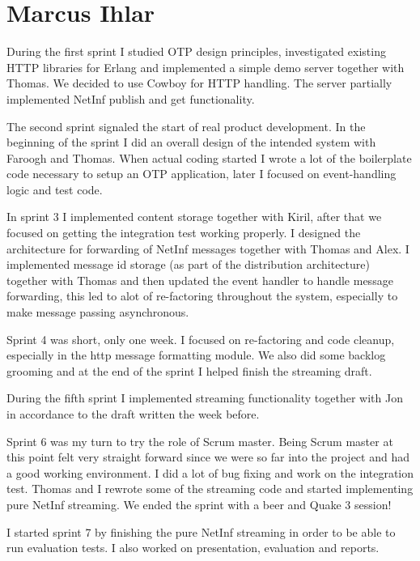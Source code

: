 \section{Marcus Ihlar}
During the first sprint I studied OTP design principles, investigated existing HTTP libraries for Erlang and implemented a simple demo server together with Thomas. We decided to use Cowboy for HTTP handling. The server partially implemented NetInf publish and get functionality.

The second sprint signaled the start of real product development. In the beginning of the sprint I did an overall design of the intended system with Faroogh and Thomas. When actual coding started I wrote a lot of the boilerplate code necessary to setup an OTP application, later I focused on event-handling logic and test code.

In sprint 3 I implemented content storage together with Kiril, after that we focused on getting the integration test working properly. I designed the architecture for forwarding of NetInf messages together with Thomas and Alex. I implemented message id storage (as part of the distribution architecture) together with Thomas and then updated the event handler to handle message forwarding, this led to alot of re-factoring throughout the system, especially to make message passing asynchronous. 

Sprint 4 was short, only one week. I focused on re-factoring and code cleanup, especially in the http message formatting module. We also did some backlog grooming and at the end of the sprint I helped finish the streaming draft.

During the fifth sprint I implemented streaming functionality together with Jon in accordance to the draft written the week before. 

Sprint 6 was my turn to try the role of Scrum master. Being Scrum master at this point felt very straight forward since we were so far into the project and had a good working environment. I did a lot of bug fixing and work on the integration test. Thomas and I rewrote some of the streaming code and started implementing pure NetInf streaming. We ended the sprint with a beer and Quake 3 session!

I started sprint 7 by finishing the pure NetInf streaming in order to be able to run evaluation tests. I also worked on presentation, evaluation and reports.
 

 



